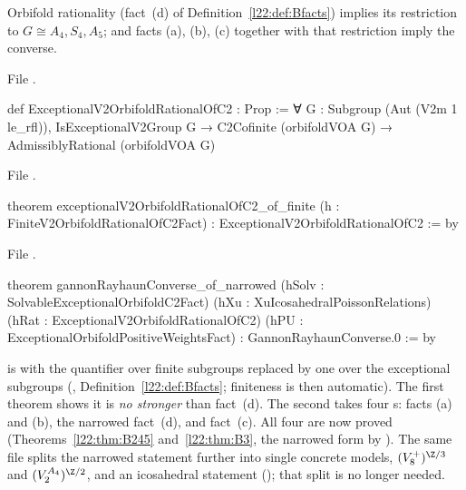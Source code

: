 \begin{theorem}\label{l22:thm:narrowed}
Orbifold rationality \textup{(}fact~(d) of Definition~\ref{l22:def:Bfacts}\textup{)} implies its restriction to
$G\cong A_4,S_4,A_5$; and facts (a), (b), (c) together with that restriction imply the converse.
\end{theorem}
\noindent File .
\begin{leancode}
def ExceptionalV2OrbifoldRationalOfC2 : Prop :=
  ∀ G : Subgroup (Aut (V2m 1 le_rfl)), IsExceptionalV2Group G →
    C2Cofinite (orbifoldVOA G) → AdmissiblyRational (orbifoldVOA G)
\end{leancode}
\noindent File .
\begin{leancode}
theorem exceptionalV2OrbifoldRationalOfC2_of_finite (h : FiniteV2OrbifoldRationalOfC2Fact) :
    ExceptionalV2OrbifoldRationalOfC2 := by
\end{leancode}
\noindent File .
\begin{leancode}
theorem gannonRayhaunConverse_of_narrowed (hSolv : SolvableExceptionalOrbifoldC2Fact)
    (hXu : XuIcosahedralPoissonRelations) (hRat : ExceptionalV2OrbifoldRationalOfC2)
    (hPU : ExceptionalOrbifoldPositiveWeightsFact) : GannonRayhaunConverse.{0} := by
\end{leancode}

\begin{dictionary}
 is  with the quantifier over finite
subgroups replaced by one over the exceptional subgroups (, Definition~\ref{l22:def:Bfacts};
finiteness is then automatic). The first theorem shows it is \emph{no stronger} than fact~(d). The second takes four
s: facts (a) and (b), the narrowed fact~(d), and fact~(c). All four are now proved (Theorems~\ref{l22:thm:B245} and~\ref{l22:thm:B3},
the narrowed form by ). The same file splits the narrowed statement
further into single concrete models, $(V_8^+)^{\Z/3}$ and $(V_2^{A_4})^{\Z/2}$, and an icosahedral statement
(); that split is no longer needed.
\end{dictionary}

